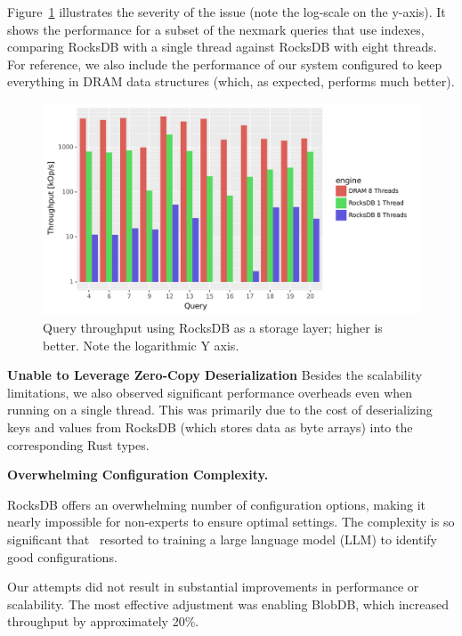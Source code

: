 Figure~\ref{fig:rocksdb} illustrates the severity of the issue (note
the log-scale on the y-axis). It shows the performance for a subset of
the nexmark queries that use indexes, comparing RocksDB with a single
thread against RocksDB with eight threads. For reference, we also
include the performance of our system configured to keep everything in
DRAM data structures (which, as expected, performs much better).

\begin{figure}[h]
  \begin{center}
  \includegraphics[scale=.43]{graph/rocksdb}
  \caption{Query throughput using RocksDB as a storage layer; higher
    is better.  Note the logarithmic Y axis\label{fig:rocksdb}.}
  \end{center}
\end{figure}

\textbf{Unable to Leverage Zero-Copy Deserialization} Besides the
scalability limitations, we also observed significant performance
overheads even when running on a single thread. This was primarily due
to the cost of deserializing keys and values from RocksDB (which
stores data as byte arrays) into the corresponding Rust types.

\textbf{Overwhelming Configuration Complexity.}

RocksDB offers an overwhelming number of configuration options, making
it nearly impossible for non-experts to ensure optimal settings. The
complexity is so significant that~\cite{thakkar-hotstorage24} resorted
to training a large language model (LLM) to identify good
configurations.

Our attempts did not result in substantial improvements in performance
or scalability. The most effective adjustment was enabling BlobDB,
which increased throughput by approximately 20\%.

